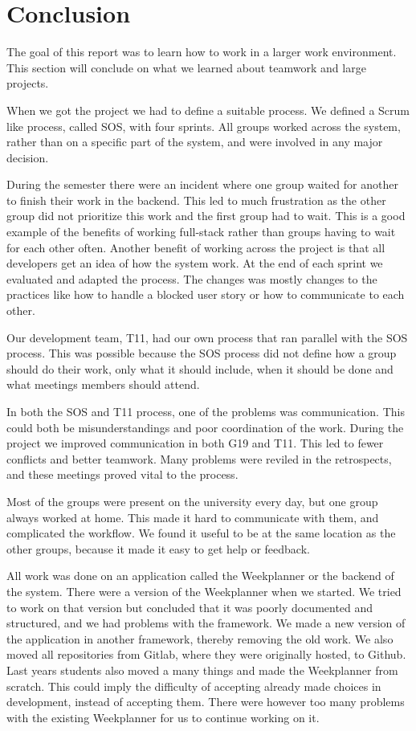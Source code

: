 \section{Conclusion}
The goal of this report was to learn how to work in a larger work environment. This section will conclude on what we learned about teamwork and large projects. 

When we got the project we had to define a suitable process. We defined a Scrum like process, called \gls{SOS}, with four sprints. All groups worked across the system, rather than on a specific part of the system, and were involved in any major decision. 

During the semester there were an incident where one group waited for another to finish their work in the backend. This led to much frustration as the other group did not prioritize this work and the first group had to wait. This is a good example of the benefits of working full-stack rather than groups having to wait for each other often. Another benefit of working across the project is that all developers get an idea of how the system work.
At the end of each sprint we evaluated and adapted the process. The changes was mostly changes to the practices like how to handle a blocked user story or how to communicate to each other.

Our development team, \gls{T11}, had our own process that ran parallel with the \gls{SOS} process. This was possible because the \gls{SOS} process did not define how a group should do their work, only what it should include, when it should be done and what meetings members should attend. 

In both the \gls{SOS} and \gls{T11} process, one of the problems was communication. This could both be misunderstandings and poor coordination of the work. During the project we improved communication in both \gls{G19} and \gls{T11}. This led to fewer conflicts and better teamwork. Many problems were reviled in the retrospects, and these meetings proved vital to the process. 

Most of the groups were present on the university every day, but one group always worked at home. This made it hard to communicate with them, and complicated the workflow. We found it useful to be at the same location as the other groups, because it made it easy to get help or feedback.

All work was done on an application called the Weekplanner or the backend of the system. There were a version of the Weekplanner when we started. We tried to work on that version but concluded that it was poorly documented and structured, and we had problems with the framework. We made a new version of the application in another framework, thereby removing the old work. We also moved all repositories from Gitlab, where they were originally hosted, to Github. Last years students also moved a many things and made the Weekplanner from scratch. This could imply the difficulty of accepting already made choices in development, instead of accepting them. There were however too many problems with the existing Weekplanner for us to continue working on it. 

